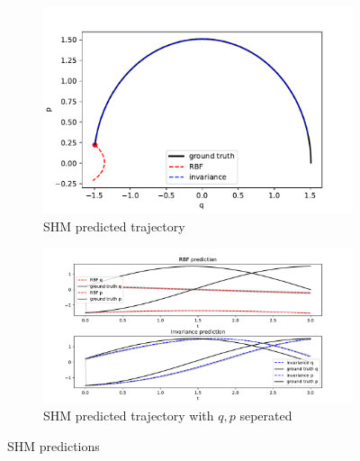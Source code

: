 \documentclass{statsmsc}
\begin{document}
\begin{figure}[H]
     \centering
     \begin{subfigure}[b]{\linewidth}
        \centering
        \includegraphics[width=\linewidth]{../codes/figures/shm_predicted_trajectory.pdf}
        \caption{SHM predicted trajectory}
        \label{fig:shm_prediction_combined}
     \end{subfigure}
     \hfill
     \begin{subfigure}[b]{\linewidth}
         \centering
         \includegraphics[width=\linewidth]{../codes/figures/shm_predicted_trajectory_seperate.pdf}
         \caption{SHM predicted trajectory with $q, p$ seperated}
         \label{fig:shm_prediction_seperate}
     \end{subfigure}
        \caption{SHM predictions}
        \label{fig:shm_prediction}
\end{figure}
\end{document}
